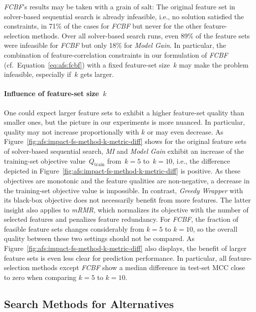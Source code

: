 \documentclass{article}
\theoremstyle{definition}
\begin{document}
\emph{FCBF}'s results may be taken with a grain of salt:
The original feature set in solver-based sequential search is already infeasible, i.e., no solution satisfied the constraints, in 71\% of the cases for \emph{FCBF} but never for the other feature-selection methods.
Over all solver-based search runs, even 89\% of the feature sets were infeasible for \emph{FCBF} but only 18\% for \emph{Model Gain}.
In particular, the combination of feature-correlation constraints in our formulation of \emph{FCBF} (cf.~Equation~\ref{eq:afs:fcbf}) with a fixed feature-set size~$k$ may make the problem infeasible, especially if~$k$ gets larger.

\paragraph{Influence of feature-set size~$k$}

One could expect larger feature sets to exhibit a higher feature-set quality than smaller ones, but the picture in our experiments is more nuanced.
In particular, quality may not increase proportionally with $k$ or may even decrease.
As Figure~\ref{fig:afs:impact-fs-method-k-metric-diff} shows for the original feature sets of solver-based sequential search, \emph{MI} and \emph{Model Gain} exhibit an increase of the training-set objective value~$Q_\text{train}$ from~$k=5$ to~$k=10$, i.e., the difference depicted in Figure~\ref{fig:afs:impact-fs-method-k-metric-diff} is positive.
As these objectives are monotonic and the feature qualities are non-negative, a decrease in the training-set objective value is impossible.
In contrast, \emph{Greedy Wrapper} with its black-box objective does not necessarily benefit from more features.
The latter insight also applies to \emph{mRMR}, which normalizes its objective with the number of selected features and penalizes feature redundancy.
For \emph{FCBF}, the fraction of feasible feature sets changes considerably from $k=5$ to $k=10$, so the overall quality between these two settings should not be compared.
As Figure~\ref{fig:afs:impact-fs-method-k-metric-diff} also displays, the benefit of larger feature sets is even less clear for prediction performance.
In particular, all feature-selection methods except \emph{FCBF} show a median difference in test-set MCC close to zero when comparing $k=5$ to $k=10$.

\subsection{Search Methods for Alternatives}
\label{sec:afs:evaluation:search-methods}
\end{document}
